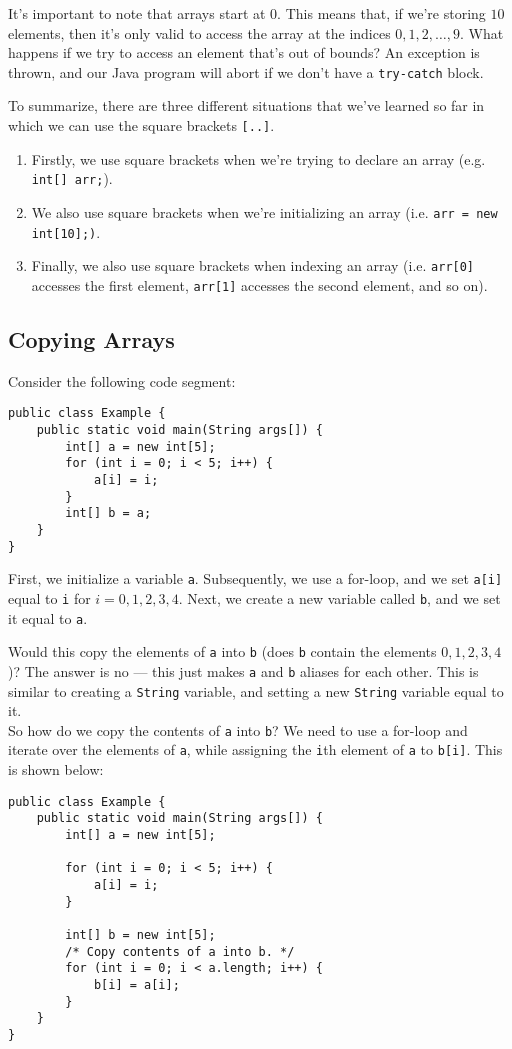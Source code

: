It's important to note that arrays start at $0$. This means that, if we're storing $10$ elements, then it's only valid to access the array at the indices $0, 1, 2, \ldots, 9$. What happens if we try to access an element that's out of bounds? An exception is thrown, and our Java program will abort if we don't have a \verb!try-catch! block. 


To summarize, there are three different situations that we've learned so far in which we can use the square brackets \verb![..]!. 

\begin{enumerate}
    \item Firstly, we use square brackets when we're trying to declare an array (e.g. \verb!int[] arr;!).
    \item We also use square brackets when we're initializing an array (i.e. \verb!arr = new int[10];)!.
    \item Finally, we also use square brackets when indexing an array (i.e. \verb!arr[0]! accesses the first element, \verb!arr[1]! accesses the second element, and so on).
\end{enumerate}

\subsection{Copying Arrays}

Consider the following code segment:

\begin{lstlisting}
public class Example {
    public static void main(String args[]) {
        int[] a = new int[5];
        for (int i = 0; i < 5; i++) {
            a[i] = i;    
        }
        int[] b = a;
    }
}
\end{lstlisting}

First, we initialize a variable \verb!a!. Subsequently, we use a for-loop, and we set \verb!a[i]! equal to \verb!i! for $i = 0, 1, 2, 3, 4$.  Next, we create a new variable called \verb!b!, and we set it equal to \verb!a!. 

Would this copy the elements of \verb!a! into \verb!b! (does \verb!b! contain the elements $0, 1, 2, 3, 4$)? The answer is no --- this just makes \verb!a! and \verb!b! aliases for each other. This is similar to creating a \verb!String! variable, and setting a new \verb!String! variable equal to it. \\

So how do we copy the contents of \verb!a! into \verb!b!? We need to use a for-loop and iterate over the elements of \verb!a!, while assigning the \verb!i!th element of \verb!a! to \verb!b[i]!. This is shown below:

\begin{lstlisting}
public class Example {
    public static void main(String args[]) {
        int[] a = new int[5];
        
        for (int i = 0; i < 5; i++) {
            a[i] = i;
        }
        
        int[] b = new int[5];
        /* Copy contents of a into b. */
        for (int i = 0; i < a.length; i++) {
            b[i] = a[i];
        }
    }
}
\end{lstlisting}